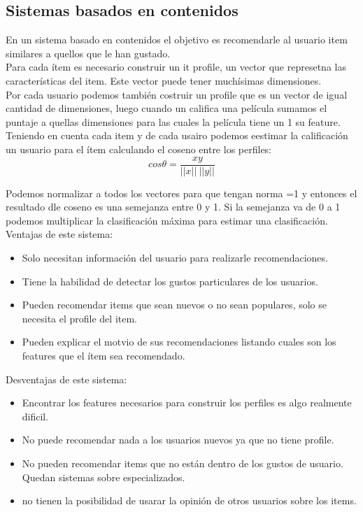 \documentclass[titlepage,a4paper]{article}
\begin{document}
\subsection*{Sistemas basados en contenidos}
En un sistema basado en contenidos el objetivo es recomendarle al usuario item similares a quellos que le han gustado. \\

Para cada ítem es necesario construir un it profile, un vector que represetna las características del item. Este vector puede tener muchísimas dimensiones. \\

Por cada usuario podemos también costruir un profile que es un vector de igual cantidad de dimensiones, luego cuando un califica una película sumamos el puntaje a quellas dimensiones para las cuales la película tiene un 1 su feature. Teniendo en cuenta cada item y de cada usairo podemos eestimar la calificación un usuario para el ítem calculando el coseno entre los perfiles: $$cos\theta = \frac{xy}{||x||\ ||y||}$$

Podemos normalizar a todos los vectores para que tengan norma =1 y entonces el resultado dle coseno es una semejanza entre 0 y 1. Si la semejanza va de 0 a 1 podemos multiplicar la clasificación máxima para estimar una clasificación. \\

Ventajas de este sistema: 
\begin{itemize}
\item Solo necesitan información del usuario para realizarle recomendaciones. 
\item Tiene la habilidad de detectar los gustos particulares de los usuarios. 
\item Pueden recomendar items que sean nuevos o no sean populares, solo se necesita el profile del item. 
\item Pueden explicar el motvio de sus recomendaciones listando cuales son los features que el ítem sea recomendado. 
\end{itemize}



Desventajas de este sistema: 
\begin{itemize}
\item Encontrar los features necesarios para construir los perfiles es algo realmente dificil. 
\item No puede recomendar nada a los usuarios nuevos ya que no tiene profile. 
\item No pueden recomendar items que no están dentro de los gustos de usuario. Quedan sistemas sobre especializados. 
\item no tienen la posibilidad de usarar la opinión de otros usuarios sobre los items. 
\end{itemize}
\end{document}
